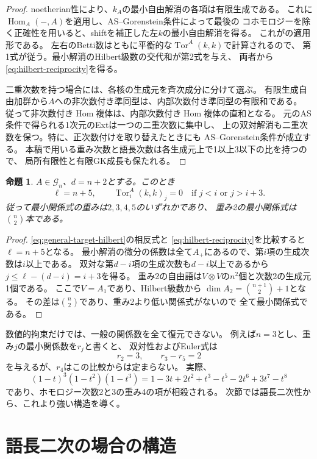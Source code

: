 \documentclass[11pt,a4paper]{ltjsarticle}
\newtheorem{proposition}[theorem]{命題}
\theoremstyle{definition}
\newcommand{\Tor}{\operatorname{Tor}}
\newcommand{\Hom}{\operatorname{Hom}}
\newcommand{\Gclass}{\mathcal G}
\begin{document}
\begin{proof}
noetherian性により、$k_A$の最小自由解消の各項は有限生成である。
これに$\Hom_A(-,A)$を適用し、AS--Gorenstein条件によって最後の
コホモロジーを除く正確性を用いると、shiftを補正した左$k$の最小自由解消を得る。
これが\cite[Lemma 1.1]{LPWZ}の適用形である。
左右のBetti数はともに平衡的な$\Tor^A(k,k)$で計算されるので、
第1式が従う。最小解消のHilbert級数の交代和が第2式を与え、
両者から\eqref{eq:hilbert-reciprocity}を得る。

二重次数を持つ場合には、各核の生成元を斉次成分に分けて選ぶ。
有限生成自由加群から$A$への非次数付き準同型は、内部次数付き準同型の有限和である。
従って非次数付き$\Hom$複体は、内部次数付き$\Hom$複体の直和となる。
元のAS条件で得られる1次元のExtは一つの二重次数に集中し、
上の双対解消も二重次数を保つ。特に、正次数付けを取り替えたときにも
AS--Gorenstein条件が成立する。
本稿で用いる重み次数と語長次数は各生成元上で1以上3以下の比を持つので、
局所有限性と有限GK成長も保たれる。
\end{proof}

\begin{proposition}\label{prop:four-strands}
$A\in\Gclass_n$、$d=n+2$とする。このとき
\[
\ell=n+5,\qquad
\Tor_i^A(k,k)_j=0\quad\text{if }j<i\text{ or }j>i+3.
\]
従って最小関係式の重みは$2,3,4,5$のいずれかであり、
重み2の最小関係式は$\binom n2$本である。
\end{proposition}

\begin{proof}
\eqref{eq:general-target-hilbert}の相反式と
\eqref{eq:hilbert-reciprocity}を比較すると$\ell=n+5$となる。
最小解消の微分の係数は全て$A_+$にあるので、第$i$項の生成次数は$i$以上である。
双対な第$d-i$項の生成次数も$d-i$以上であるから
$j\leq\ell-(d-i)=i+3$を得る。
重み2の自由語は$V\otimes V$の$n^2$個と次数2の生成元1個である。
ここで$V=A_1$であり、Hilbert級数から
$\dim A_2=\binom{n+1}{2}+1$となる。
その差は$\binom n2$であり、重み2より低い関係式がないので
全て最小関係式である。
\end{proof}

数値的拘束だけでは、一般の関係数を全て復元できない。
例えば$n=3$とし、重み$j$の最小関係数を$r_j$と書くと、
双対性およびEuler式は
\[
r_2=3,\qquad r_3-r_5=2
\]
を与えるが、$r_4$はこの比較からは定まらない。
実際、
\[
(1-t)^3(1-t^2)(1-t^3)
=1-3t+2t^2+t^3-t^5-2t^6+3t^7-t^8
\]
であり、ホモロジー次数2と3の重み4の項が相殺される。
次節では語長二次性から、これより強い構造を導く。

\section{語長二次の場合の構造}
\label{sec:quadratic-general-structure}
\end{document}
